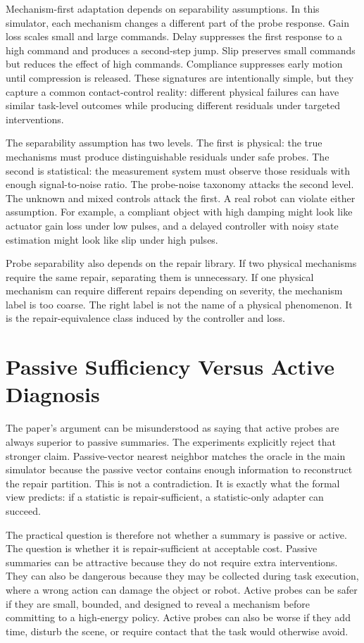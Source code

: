 \documentclass{article}
\begin{document}
Mechanism-first adaptation depends on separability assumptions. In this
simulator, each mechanism changes a different part of the probe response. Gain
loss scales small and large commands. Delay suppresses the first response to a
high command and produces a second-step jump. Slip preserves small commands but
reduces the effect of high commands. Compliance suppresses early motion until
compression is released. These signatures are intentionally simple, but they
capture a common contact-control reality: different physical failures can have
similar task-level outcomes while producing different residuals under targeted
interventions.

The separability assumption has two levels. The first is physical: the true
mechanisms must produce distinguishable residuals under safe probes. The second
is statistical: the measurement system must observe those residuals with enough
signal-to-noise ratio. The probe-noise taxonomy attacks the second level. The
unknown and mixed controls attack the first. A real robot can violate either
assumption. For example, a compliant object with high damping might look like
actuator gain loss under low pulses, and a delayed controller with noisy state
estimation might look like slip under high pulses.

Probe separability also depends on the repair library. If two physical
mechanisms require the same repair, separating them is unnecessary. If one
physical mechanism can require different repairs depending on severity, the
mechanism label is too coarse. The right label is not the name of a physical
phenomenon. It is the repair-equivalence class induced by the controller and
loss.

\section{Passive Sufficiency Versus Active Diagnosis}

The paper's argument can be misunderstood as saying that active probes are
always superior to passive summaries. The experiments explicitly reject that
stronger claim. Passive-vector nearest neighbor matches the oracle in the main
simulator because the passive vector contains enough information to reconstruct
the repair partition. This is not a contradiction. It is exactly what the formal
view predicts: if a statistic is repair-sufficient, a statistic-only adapter can
succeed.

The practical question is therefore not whether a summary is passive or active.
The question is whether it is repair-sufficient at acceptable cost. Passive
summaries can be attractive because they do not require extra interventions.
They can also be dangerous because they may be collected during task execution,
where a wrong action can damage the object or robot. Active probes can be safer
if they are small, bounded, and designed to reveal a mechanism before committing
to a high-energy policy. Active probes can also be worse if they add time,
disturb the scene, or require contact that the task would otherwise avoid.
\end{document}

